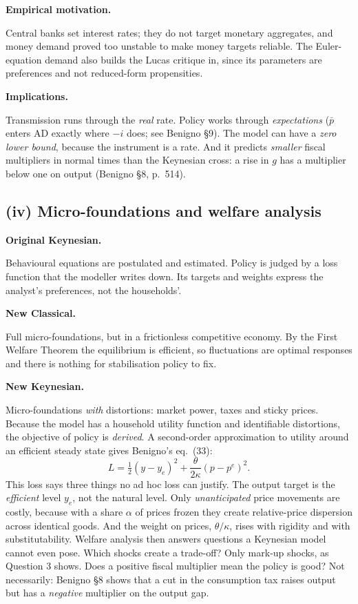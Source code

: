 \documentclass[11pt, a4paper]{article}
\newcommand{\passo}[1]{\medskip\noindent\textbf{#1}\par\nobreak}
\newcommand{\pbar}{\bar p}
\begin{document}
\passo{Empirical motivation.}
Central banks set interest rates; they do not target monetary aggregates, and money
demand proved too unstable to make money targets reliable. The Euler-equation demand also
builds the Lucas critique in, since its parameters are preferences and not reduced-form
propensities.

\passo{Implications.}
Transmission runs through the \emph{real} rate. Policy works through \emph{expectations}
($\pbar$ enters AD exactly where $-i$ does; see Benigno \S9). The model can have a
\emph{zero lower bound}, because the instrument is a rate. And it predicts \emph{smaller}
fiscal multipliers in normal times than the Keynesian cross: a rise in $g$ has a multiplier
below one on output (Benigno \S8, p.~514).

\subsection*{(iv) Micro-foundations and welfare analysis}

\passo{Original Keynesian.}
Behavioural equations are postulated and estimated. Policy is judged by a loss function that
the modeller writes down. Its targets and weights express the analyst's preferences, not the
households'.

\passo{New Classical.}
Full micro-foundations, but in a frictionless competitive economy. By the First Welfare
Theorem the equilibrium is efficient, so fluctuations are optimal responses and there is
nothing for stabilisation policy to fix.

\passo{New Keynesian.}
Micro-foundations \emph{with} distortions: market power, taxes and sticky prices. Because the
model has a household utility function and identifiable distortions, the objective of policy
is \emph{derived}. A second-order approximation to utility around an efficient steady state
gives Benigno's eq.\ (33):
\[
L=\tfrac12\left(y-y_e\right)^2+\frac{\theta}{2\kappa}\left(p-p^e\right)^2 .
\]
This loss says three things no ad hoc loss can justify. The output target is the
\emph{efficient} level $y_e$, not the natural level. Only \emph{unanticipated} price
movements are costly, because with a share $\alpha$ of prices frozen they create
relative-price dispersion across identical goods. And the weight on prices, $\theta/\kappa$,
rises with rigidity and with substitutability. Welfare analysis then answers questions a
Keynesian model cannot even pose. Which shocks create a trade-off? Only mark-up shocks, as
Question 3 shows. Does a positive fiscal multiplier mean the policy is good? Not necessarily: Benigno
\S8 shows that a cut in the consumption tax raises output but has a \emph{negative} multiplier
on the output gap.
\end{document}
